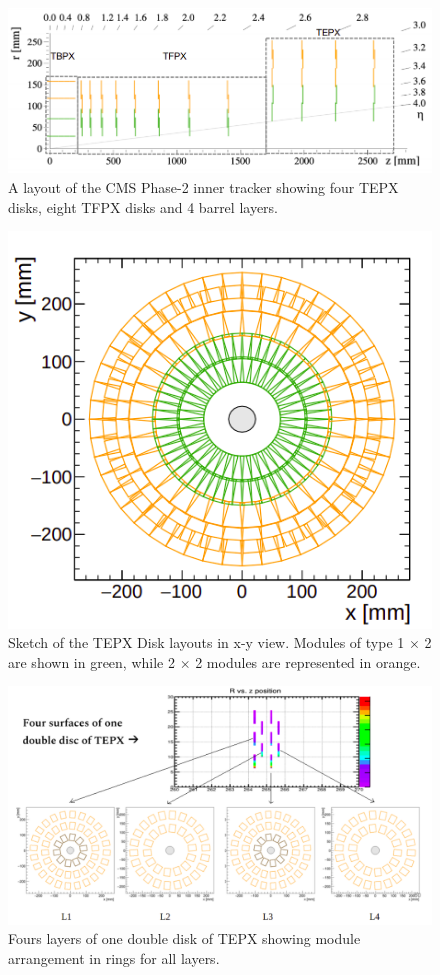 \begin{figure}[H]
  \centering
  \includegraphics[width=0.8\columnwidth]{./tepx_geometry.png}
  \caption{ \onehalfspacing A layout of the CMS Phase-2 inner tracker showing four TEPX disks, eight TFPX disks and 4 barrel layers.}
  \label{fig:CMS}
\end{figure}


\begin{figure}[H]
  \centering
  \includegraphics[width=0.5 \columnwidth]{./xydisc.png}
  \caption{ \onehalfspacing Sketch of the TEPX Disk layouts in x-y view. Modules of type 1 $\times$ 2 are shown in green, while 2 $\times$ 2 modules are represented in orange.}
  \label{fig:CMS}
\end{figure}

\begin{figure}[H]
  \centering
  \includegraphics[width=1 \columnwidth]{./fourlayers.png}
  \caption{ \onehalfspacing Fours layers of one double disk of TEPX showing module arrangement in rings for all layers.}
  \label{fig:CMS}
\end{figure}




